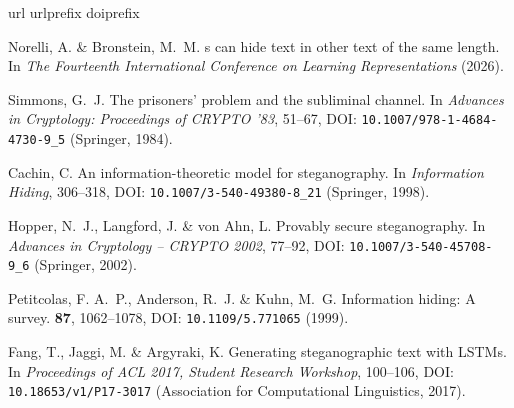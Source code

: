 \documentclass[fleqn,10pt]{wlscirep}
\begin{document}
\begin{thebibliography}{10}
\expandafter\ifx\csname url\endcsname\relax
  \def\url#1{\texttt{#1}}\fi
\expandafter\ifx\csname urlprefix\endcsname\relax\def\urlprefix{URL }\fi
\expandafter\ifx\csname doiprefix\endcsname\relax\def\doiprefix{DOI: }\fi
\providecommand{\bibinfo}[2]{#2}
\providecommand{\eprint}[2][]{\url{#2}}

\bibinfo{author}{Norelli, A.} \& \bibinfo{author}{Bronstein, M.~M.}
\newblock \bibinfo{title}{{LLM}s can hide text in other text of the same
  length}.
\newblock In \emph{\bibinfo{booktitle}{The Fourteenth International Conference
  on Learning Representations}} (\bibinfo{year}{2026}).

\bibinfo{author}{Simmons, G.~J.}
\newblock \bibinfo{title}{The prisoners' problem and the subliminal channel}.
\newblock In \emph{\bibinfo{booktitle}{Advances in Cryptology: Proceedings of
  {CRYPTO} '83}}, \bibinfo{pages}{51--67},
  \doiprefix\url{10.1007/978-1-4684-4730-9_5} (\bibinfo{publisher}{Springer},
  \bibinfo{year}{1984}).

\bibinfo{author}{Cachin, C.}
\newblock \bibinfo{title}{An information-theoretic model for steganography}.
\newblock In \emph{\bibinfo{booktitle}{Information Hiding}},
  \bibinfo{pages}{306--318}, \doiprefix\url{10.1007/3-540-49380-8_21}
  (\bibinfo{publisher}{Springer}, \bibinfo{year}{1998}).

\bibinfo{author}{Hopper, N.~J.}, \bibinfo{author}{Langford, J.} \&
  \bibinfo{author}{von Ahn, L.}
\newblock \bibinfo{title}{Provably secure steganography}.
\newblock In \emph{\bibinfo{booktitle}{Advances in Cryptology -- {CRYPTO}
  2002}}, \bibinfo{pages}{77--92}, \doiprefix\url{10.1007/3-540-45708-9_6}
  (\bibinfo{publisher}{Springer}, \bibinfo{year}{2002}).

\bibinfo{author}{Petitcolas, F. A.~P.}, \bibinfo{author}{Anderson, R.~J.} \&
  \bibinfo{author}{Kuhn, M.~G.}
\newblock \bibinfo{journal}{\bibinfo{title}{Information hiding: A survey}}.
  \textbf{\bibinfo{volume}{87}}, \bibinfo{pages}{1062--1078},
  \doiprefix\url{10.1109/5.771065} (\bibinfo{year}{1999}).

\bibinfo{author}{Fang, T.}, \bibinfo{author}{Jaggi, M.} \&
  \bibinfo{author}{Argyraki, K.}
\newblock \bibinfo{title}{Generating steganographic text with {LSTM}s}.
\newblock In \emph{\bibinfo{booktitle}{Proceedings of {ACL} 2017, Student
  Research Workshop}}, \bibinfo{pages}{100--106},
  \doiprefix\url{10.18653/v1/P17-3017} (\bibinfo{publisher}{Association for
  Computational Linguistics}, \bibinfo{year}{2017}).


\end{thebibliography}
\end{document}
